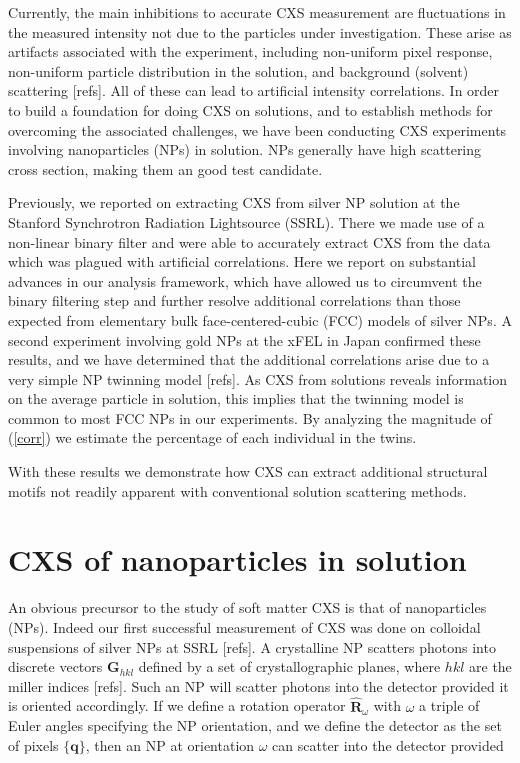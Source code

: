 \documentclass [11pt,fleqn]{article}
\begin{document}
Currently, the main inhibitions to accurate CXS measurement are fluctuations in the measured intensity not due to the particles under investigation. These arise as artifacts associated with the experiment, including non-uniform pixel response, non-uniform particle distribution in the solution, and background (solvent) scattering [refs]. All of these can lead to artificial intensity correlations. In order to build a foundation for doing CXS on solutions, and to establish methods for overcoming the associated challenges, we have been conducting CXS experiments involving nanoparticles (NPs) in solution. NPs generally have high scattering cross section, making them an good test candidate.

Previously, we reported on extracting CXS from silver NP solution at the Stanford Synchrotron Radiation Lightsource (SSRL). There we made use of a non-linear binary filter and were able to accurately extract CXS from the data which was plagued with artificial correlations. Here we report on substantial advances in our analysis framework, which have allowed us to circumvent the binary filtering step and further resolve additional correlations than those expected from elementary bulk face-centered-cubic (FCC) models of silver NPs. A second experiment involving gold NPs at the xFEL in Japan  confirmed these results, and we have determined that the additional correlations arise due to a very simple NP twinning model [refs]. As CXS from solutions reveals information on the average particle in solution, this implies that the twinning model is common to most FCC NPs in our experiments. By analyzing the magnitude of (\ref{corr}) we estimate the percentage of each individual in the twins.

With these results we demonstrate how CXS can extract additional structural motifs not readily apparent with conventional solution scattering methods.
 
\section{CXS of nanoparticles in solution}

An obvious precursor to the study of soft matter  CXS is that of nanoparticles (NPs). Indeed our first successful measurement of CXS was done on colloidal suspensions of silver NPs at SSRL [refs]. A crystalline NP scatters photons into discrete vectors $\bm G_{hkl}$ defined by a set of crystallographic planes, where $hkl$ are the miller indices [refs]. Such an NP will scatter photons into the detector provided it is oriented accordingly. If we define a rotation operator $\hat{\bm R}_\omega$ with $\omega$ a triple of Euler angles specifying the NP orientation, and we define the detector as the set of pixels $\{\bm q\}$, then an NP at orientation $\omega$ can scatter into the detector provided 
\end{document}

